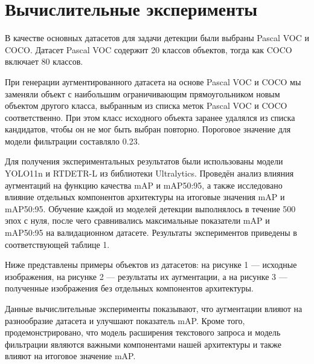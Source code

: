 \section{Вычислительные эксперименты}

В качестве основных датасетов для задачи детекции были выбраны Pascal VOC\cite{pascal-voc-2007} и COCO\cite{DBLP:journals/corr/LinMBHPRDZ14}. Датасет Pascal VOC содержит 20 классов объектов, тогда как COCO включает 80 классов. 

При генерации аугментированного датасета на основе Pascal VOC и COCO мы заменяли объект с наибольшим ограничивающим прямоугольником новым объектом другого класса, выбранным из списка меток Pascal VOC и COCO соответственно. При этом класс исходного объекта заранее удалялся из списка кандидатов, чтобы он не мог быть выбран повторно. Пороговое значение для модели фильтрации составляло 0.23.

Для получения экспериментальных результатов были использованы модели YOLO11n и RTDETR-L из библиотеки Ultralytics. Проведён анализ влияния аугментаций на функцию качества mAP и mAP50:95, а также исследовано влияние отдельных компонентов архитектуры на итоговые значения mAP и mAP50:95. Обучение каждой из моделей детекции выполнялось в течение 500 эпох с нуля, после чего сравнивались максимальные показатели mAP и mAP50:95 на валидационном датасете. Результаты экспериментов приведены в соответствующей таблице 1. 

Ниже представлены примеры объектов из датасетов: на рисунке 1 — исходные изображения, на рисунке 2 — результаты их аугментации, а на рисунке 3 — полученные изображения без отдельных компонентов архитектуры. 

Данные вычислительные эксперименты показывают, что аугментации влияют на разнообразие датасета и улучшают показатель mAP. Кроме того, продемонстрировано, что модель расширения текстового запроса и модель фильтрации являются важными компонентами нашей архитектуры и также влияют на итоговое значение mAP.




